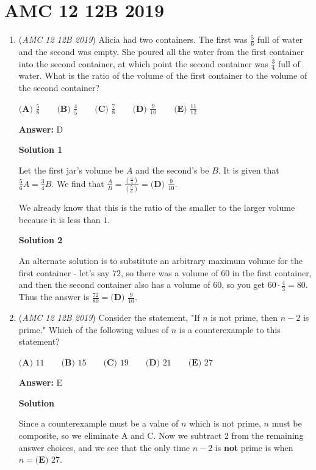 \section{AMC 12 12B 2019}
        \begin{enumerate}
        	\item (\textit{AMC 12 12B 2019}) Alicia had two containers. The first was $\frac{5}{6}$ full of water and the second was empty. She poured all the water from the first container into the second container, at which point the second container was $\frac{3}{4}$ full of water. What is the ratio of the volume of the first container to the volume of the second container?


 $\textbf{(A) } \frac{5}{8} \qquad \textbf{(B) } \frac{4}{5} \qquad \textbf{(C) } \frac{7}{8} \qquad \textbf{(D) } \frac{9}{10} \qquad \textbf{(E) } \frac{11}{12}$

 \textbf{Answer: }D



\textbf{Solution 1}

Let the first jar's volume be $A$ and the second's be $B$. It is given that $\frac{5}{6}A=\frac{3}{4}B$. We find that $\frac{A}{B}=\frac{\left(\frac{3}{4}\right)}{\left(\frac{5}{6}\right)}=\boxed{\textbf{(D) }\frac{9}{10}}.$ 

 We already know that this is the ratio of the smaller to the larger volume because it is less than $1.$




\textbf{Solution 2}

An alternate solution is to substitute an arbitrary maximum volume for the first container - let's say $72$, so there was a volume of $60$ in the first container, and then the second container also has a volume of $60$, so you get $60 \cdot \frac{4}{3} = 80$. Thus the answer is $\frac{72}{80} = \boxed{\textbf{(D) }\frac{9}{10}}$.

 


	\item (\textit{AMC 12 12B 2019}) Consider the statement, "If $n$ is not prime, then $n-2$ is prime." Which of the following values of $n$ is a counterexample to this statement?


 $\textbf{(A) } 11 \qquad \textbf{(B) } 15 \qquad \textbf{(C) } 19 \qquad \textbf{(D) } 21 \qquad \textbf{(E) } 27$

 \textbf{Answer: }E



\textbf{Solution}

Since a counterexample must be a value of $n$ which is not prime, $n$ must be composite, so we eliminate $\text{A}$ and $\text{C}$. Now we subtract $2$ from the remaining answer choices, and we see that the only time $n-2$ is \textbf{not} prime is when $n = \boxed{\textbf{(E) }27}$.


\end{enumerate}
